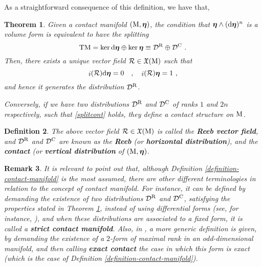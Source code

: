\documentclass[12pt]{report}
\newtheorem{teor}{Theorem}[chapter]
\newtheorem{definition}[teor]{Definition}
\newtheorem{remark}[teor]{Remark}
\def\beq{\begin{equation}}
\def\eeq{\end{equation}}
\def\vf{\mathfrak X}
\def\d{{\rm d}}
\def\bmeta{\mbox{\boldmath $\eta$}}
\def\Tan{{\rm T}}
\def\inn{\mathop{i}\nolimits}
\newcommand{\Reeb}{\mathcal{R}}
\begin{document}
As a straightforward consequence of this definition, we have that, 

\begin{teor}
\label{1stprop}
Given a contact manifold $({\rm M},\bmeta)$,
the condition that $\bmeta\wedge(\d\bmeta)^{n}$ is a volume form
is equivalent to have the splitting 
\beq
\label{splitcont}
\Tan {\rm M} =\ker\d\bmeta\oplus\ker\bmeta\equiv\mathcal{D}^{\rm R}\oplus\mathcal{D}^{\rm C} \ . 
\eeq
Then, there exists a unique vector field $\Reeb\in\vf({\rm M})$ such that
\begin{equation}
\label{eq-Reeb}
\inn(\Reeb)\d\bmeta = 0\quad ,\quad
\inn(\Reeb)\bmeta = 1 \ ,
\end{equation}
and hence it generates the distribution ${\cal D}^{\rm R}$.

Conversely, if we have two distributions ${\cal D}^{\rm R}$ and ${\cal D}^{\rm C}$
of ranks $1$ and $2n$ respectively, such that
\eqref{splitcont} holds, they define a contact structure on ${\rm M}$.
\end{teor}

\begin{definition}
The above vector field $\Reeb\in\vf({\rm M})$
is called the {\sl \textbf{Reeb vector field}},
and ${\cal D}^{\rm R}$ and $\mathcal{D}^{\rm C}$
are known as the {\sl \textbf{Reeb}} (or {\sl \textbf{horizontal distribution}}\/),
and the {\sl \textbf{contact}} (or {\sl \textbf{vertical distribution}} of $({\rm M},\bmeta)$.
\end{definition}

\begin{remark}{\rm
It is relevant to point out that, although Definition \ref{definition-contact-manifold} is the most assumed,
there are other different terminologies in relation to the concept of {\sl contact manifold}.
For instance, it can be defined by demanding the existence of two distributions
${\cal D}^{\rm R}$ and $\mathcal{D}^{\rm C}$, satisfying the properties stated in Theorem \ref{1stprop}, instead of using differential forms 
(see, for instance, \cite{Ar-89,Geiges-2008,GG-2022,KA-2013}),
and when these distributions are associated to a fixed form,
it is called a {\sl \textbf{strict contact manifold}}.
Also, in \cite{AM-78}, a more generic definition is given,
by demanding the existence of a $2$-form of maximal rank in an odd-dimensional manifold, 
and then calling {\sl \textbf{exact contact}} the case in which this form is exact
(which is the case of Definition \ref{definition-contact-manifold}).
}\end{remark}
\end{document}
